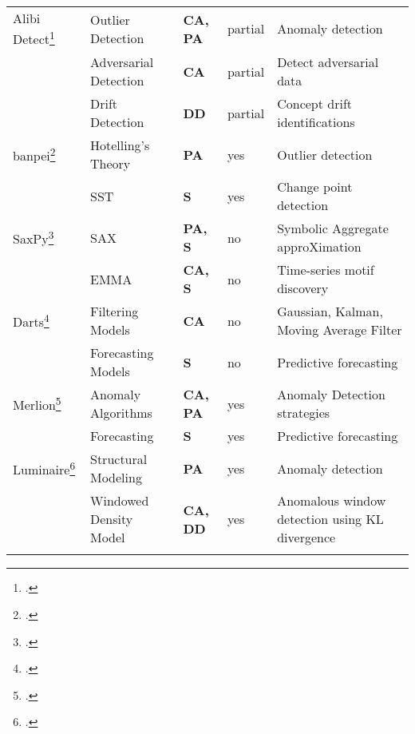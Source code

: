 \begin{longtable}{llllp{2.75cm}}
    Alibi Detect\footcite{alibi-detect} & Outlier Detection & \textbf{CA, PA} & partial & Anomaly detection\\
    & Adversarial Detection & \textbf{CA} & partial & Detect adversarial data \\
    & Drift Detection & \textbf{DD} & partial & Concept drift identifications \\
    \midrule 
    banpei\footcite{banpei} & Hotelling's Theory &  \textbf{PA} & yes & Outlier detection\\
    & SST & \textbf{S} & yes & Change point detection \\
    \midrule 
    SaxPy\footcite{senin2018grammarviz-saxpy} & SAX &  \textbf{PA, S} & no & Symbolic Aggregate approXimation \\
    & EMMA & \textbf{CA, S} & no & Time-series motif discovery\\
    \midrule 
    Darts\footcite{herzen2021darts} & Filtering Models & \textbf{CA} & no & Gaussian, Kalman, Moving Average Filter \\
    & Forecasting Models & \textbf{S} & no & Predictive forecasting \\
    \midrule 
    Merlion\footcite{bhatnagar2021merlion} & Anomaly Algorithms &  \textbf{CA, PA} & yes & Anomaly Detection strategies \\
    & Forecasting & \textbf{S} & yes & Predictive forecasting \\
    \midrule 
    Luminaire\footcite{chakraborty2020building-luminaire} & Structural Modeling &  \textbf{ PA } & yes & Anomaly detection \\
    & Windowed Density Model & \textbf{CA, DD} & yes & Anomalous window detection using KL divergence \\
    \label{tab:anom_detect_lib}
\end{longtable}

